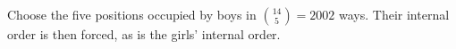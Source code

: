 Choose the five positions occupied by boys in $\binom{14}{5}=\boxed{2002}$ ways. Their internal order is then forced, as is the girls' internal order.
